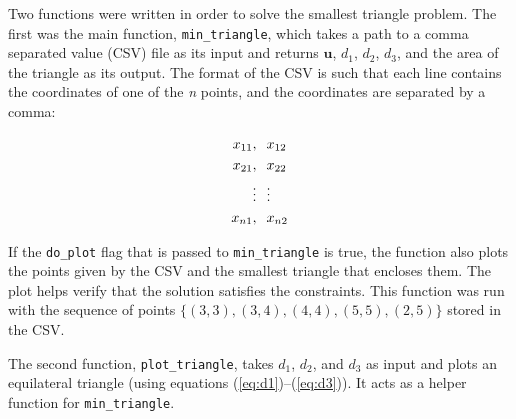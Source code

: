 \documentclass{article}
\begin{document}
\newpage


Two functions were written in order to solve the smallest triangle problem.
The first was the main function, \texttt{min\_triangle}, which takes a path to a comma separated value (CSV) file as its input and returns $\mathbf{u}$, $d_1$, $d_2$, $d_3$, and the area of the triangle as its output.
The format of the CSV is such that each line contains the coordinates of one of the \textit{n} points, and the coordinates are separated by a comma:

\begin{align*}
x_{11}, & \hspace{0.1in} x_{12}\\
x_{21}, & \hspace{0.1in} x_{22}\\
\vdots & \hspace{0.1in} \vdots\\
x_{n1}, & \hspace{0.1in} x_{n2}
\end{align*}

\noindent If the \texttt{do\_plot} flag that is passed to \texttt{min\_triangle} is true, the function also plots the points given by the CSV and the smallest triangle that encloses them.
The plot helps verify that the solution satisfies the constraints.
This function was run with the sequence of points $\{(3,3), (3,4), (4,4), (5,5), (2,5)\}$ stored in the CSV.

The second function, \texttt{plot\_triangle}, takes $d_1$, $d_2$, and $d_3$ as input and plots an equilateral triangle (using equations (\ref{eq:d1})--(\ref{eq:d3})).
It acts as a helper function for \texttt{min\_triangle}.
\end{document}
